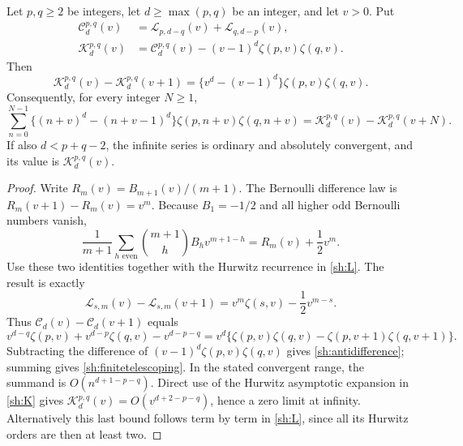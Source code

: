 \begin{theorem}\label{sh:primitive}
Let $p,q\ge2$ be integers, let $d\ge\max(p,q)$ be an integer,
and let $v>0$.  Put
\begin{align}
 \mathcal C_d^{p,q}(v)
   &=\mathcal L_{p,d-q}(v)+\mathcal L_{q,d-p}(v),\label{sh:Chigh}\\
 \mathcal K_d^{p,q}(v)
   &=\mathcal C_d^{p,q}(v)
       -(v-1)^d\zeta(p,v)\zeta(q,v).\label{sh:K}
\end{align}
Then
\begin{equation}\label{sh:antidifference}
 \boxed{\mathcal K_d^{p,q}(v)-\mathcal K_d^{p,q}(v+1)
  =\{v^d-(v-1)^d\}\zeta(p,v)\zeta(q,v).}
\end{equation}
Consequently, for every integer $N\ge1$,
\begin{equation}\label{sh:finitetelescoping}
 \sum_{n=0}^{N-1}
 \{(n+v)^d-(n+v-1)^d\}\zeta(p,n+v)\zeta(q,n+v)
 =\mathcal K_d^{p,q}(v)-\mathcal K_d^{p,q}(v+N).
\end{equation}
If also $d<p+q-2$, the infinite series is ordinary and absolutely
convergent, and its value is $\mathcal K_d^{p,q}(v)$.
\end{theorem}

\begin{proof}
Write $R_m(v)=B_{m+1}(v)/(m+1)$.  The Bernoulli difference law is
$R_m(v+1)-R_m(v)=v^m$.  Because $B_1=-1/2$ and all higher odd
Bernoulli numbers vanish,
\[
 \frac1{m+1}\sum_{h\text{ even}}
       \binom{m+1}{h}B_hv^{m+1-h}
 =R_m(v)+\frac12v^m.
\]
Use these two identities together with the Hurwitz recurrence in
\eqref{sh:L}.  The result is exactly
\begin{equation}\label{sh:Ldifference}
 \mathcal L_{s,m}(v)-\mathcal L_{s,m}(v+1)
   =v^m\zeta(s,v)-\frac12v^{m-s}.
\end{equation}
Thus $\mathcal C_d(v)-\mathcal C_d(v+1)$ equals
\[
 v^{d-q}\zeta(p,v)+v^{d-p}\zeta(q,v)-v^{d-p-q}
 =v^d\{\zeta(p,v)\zeta(q,v)
              -\zeta(p,v+1)\zeta(q,v+1)\}.
\]
Subtracting the difference of $(v-1)^d\zeta(p,v)\zeta(q,v)$
gives \eqref{sh:antidifference}; summing gives
\eqref{sh:finitetelescoping}.  In the stated convergent range,
the summand is $O(n^{d+1-p-q})$.  Direct use of the Hurwitz
asymptotic expansion in \eqref{sh:K} gives
$\mathcal K_d^{p,q}(v)=O(v^{d+2-p-q})$, hence a zero limit at
infinity.  Alternatively this last bound follows term by term in
\eqref{sh:L}, since all its Hurwitz orders are then at least two.
\end{proof}

